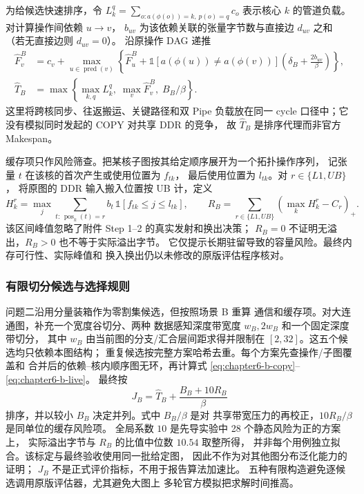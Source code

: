 为给候选快速排序，令 $L_k^q=\sum_{o:a(\phi(o))=k,\,p(o)=q}c_o$
表示核心 $k$ 的管道负载。对计算操作间依赖 $u\to v$，
$b_{uv}$ 为该依赖关联的张量字节数与直接边 $d_{uv}$ 之和
（若无直接边则 $d_{uv}=0$）。
沿原操作 DAG 递推
\begin{align}
\widehat F_v^B&=c_v+
\max_{u\in\operatorname{pred}(v)}
\left\{\widehat F_u^B+
\mathbb 1[a(\phi(u))\ne a(\phi(v))]
\left(\delta_B+\frac{2b_{uv}}{\beta}\right)\right\},\\
\widehat T_B&=\max\left\{
\max_{k,q}L_k^q,\;\max_v\widehat F_v^B,\;B_B/\beta\right\}.
\label{eq:chapter6-b-time}
\end{align}
这里将跨核同步、往返搬运、关键路径和双 Pipe 负载放在同一
cycle 口径中；它没有模拟同时发起的 COPY 对共享 DDR 的竞争，
故 $\widehat T_B$ 是排序代理而非官方 Makespan。

缓存项只作风险筛查。把某核子图按其给定顺序展开为一个拓扑操作序列，
记张量 $t$ 在该核的首次产生或使用位置为 $f_{tk}$，
最后使用位置为 $l_{tk}$。对 $r\in\{L1,UB\}$，
将原图的 DDR 输入搬入位置按 UB 计，定义
\begin{equation}
H_k^r=\max_j\sum_{t:\,\operatorname{pos}_k(t)=r}
b_t\,\mathbb 1[f_{tk}\le j\le l_{tk}],\qquad
R_B=\sum_{r\in\{L1,UB\}}
\left(\max_k H_k^r-C_r\right)_+.
\label{eq:chapter6-b-live}
\end{equation}
该区间峰值忽略了附件 Step 1--2 的真实发射和换出决策；
$R_B=0$ 不证明无溢出，$R_B>0$ 也不等于实际溢出字节。
它仅提示长期驻留导致的容量风险。最终内存可行性、实际峰值和
换入换出仍以未修改的原版评估程序核对。

\subsubsection{有限切分候选与选择规则}
问题二沿用分量装箱作为零割集候选，但按照场景 B 重算
通信和缓存项。对大连通图，补充一个宽度谷切分、两种
数据感知深度带宽度 $w_B,2w_B$ 和一个固定深度带切分，
其中 $w_B$ 由当前图的分支/汇合层间距求得并限制在
$[2,32]$。这五个候选均只依赖本图结构；
重复候选按完整方案哈希去重。每个方案先查操作/子图覆盖和
合并后的依赖--核内顺序图无环，再计算式
\eqref{eq:chapter6-b-copy}--\eqref{eq:chapter6-b-live}。
最终按
\begin{equation}
J_B=\widehat T_B+\frac{B_B+10R_B}{\beta}
\label{eq:chapter6-b-rank}
\end{equation}
排序，并以较小 $B_B$ 决定并列。式中 $B_B/\beta$ 是对
共享带宽压力的再校正，$10R_B/\beta$ 是同单位的缓存风险项。
全局系数 $10$ 是先导实验中 28 个静态风险为正的方案上，
实际溢出字节与 $R_B$ 的比值中位数 $10.54$ 取整所得，
并非每个用例独立拟合。该标定与最终验收使用同一批给定图，
因此不作为对其他图分布泛化能力的证明；
$J_B$ 不是正式评价指标，不用于报告算法加速比。
五种有限构造避免逐候选调用原版评估器，尤其避免大图上
多轮官方模拟把求解时间推高。

